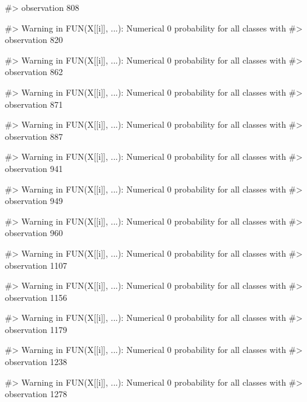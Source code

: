 \begin{Schunk}
\begin{Soutput}
#> observation 808
\end{Soutput}
\begin{Soutput}
#> Warning in FUN(X[[i]], ...): Numerical 0 probability for all classes with
#> observation 820
\end{Soutput}
\begin{Soutput}
#> Warning in FUN(X[[i]], ...): Numerical 0 probability for all classes with
#> observation 862
\end{Soutput}
\begin{Soutput}
#> Warning in FUN(X[[i]], ...): Numerical 0 probability for all classes with
#> observation 871
\end{Soutput}
\begin{Soutput}
#> Warning in FUN(X[[i]], ...): Numerical 0 probability for all classes with
#> observation 887
\end{Soutput}
\begin{Soutput}
#> Warning in FUN(X[[i]], ...): Numerical 0 probability for all classes with
#> observation 941
\end{Soutput}
\begin{Soutput}
#> Warning in FUN(X[[i]], ...): Numerical 0 probability for all classes with
#> observation 949
\end{Soutput}
\begin{Soutput}
#> Warning in FUN(X[[i]], ...): Numerical 0 probability for all classes with
#> observation 960
\end{Soutput}
\begin{Soutput}
#> Warning in FUN(X[[i]], ...): Numerical 0 probability for all classes with
#> observation 1107
\end{Soutput}
\begin{Soutput}
#> Warning in FUN(X[[i]], ...): Numerical 0 probability for all classes with
#> observation 1156
\end{Soutput}
\begin{Soutput}
#> Warning in FUN(X[[i]], ...): Numerical 0 probability for all classes with
#> observation 1179
\end{Soutput}
\begin{Soutput}
#> Warning in FUN(X[[i]], ...): Numerical 0 probability for all classes with
#> observation 1238
\end{Soutput}
\begin{Soutput}
#> Warning in FUN(X[[i]], ...): Numerical 0 probability for all classes with
#> observation 1278
\end{Soutput}
\begin{Soutput}

\end{Soutput}
\end{Schunk}
